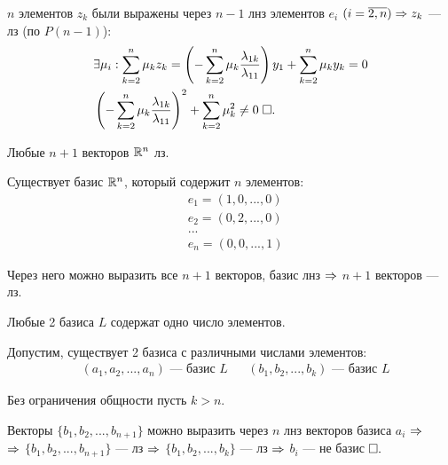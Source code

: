 \documentclass{article}
\begin{document}
\begin{enumerate}
\begin{enumerate}
		$n$ элементов $z_{k}$ были выражены через $n-1$ лнз элементов $e_{i}$ $(i=\overline{2,n})\Rarr z_{k}$ --- лз (по $P(n-1)$):
		\begin{align*}
			 & \exists\mu_{i}:\sum_{k=2}^{n}\mu_{k}z_{k}=\left(-\sum_{k=2}^{n}\mu_{k}\frac{\lambda_{1k}}{\lambda_{11}}\right)y_1+\sum_{k=2}^{n}\mu_{k}y_{k}=0 \\
			 & \left(-\sum_{k=2}^{n}\mu_{k}\frac{\lambda_{1k}}{\lambda_{11}}\right)^{2}+\sum_{k=2}^{n}\mu_{k}^{2}\neq 0\qed
		\end{align*}
	\end{enumerate}
\end{enumerate}

\pagebreak

\result[1]

Любые $n+1$ векторов $\R^{n}$ лз.

\proof

Существует базис $\R^{n}$, который содержит $n$ элементов:
\begin{align*}
	 & e_1=(1,0,...,0)   \\
	 & e_2=(0,2,...,0)   \\
	 & ...               \\
	 & e_{n}=(0,0,...,1)
\end{align*}

Через него можно выразить все $n+1$ векторов, базис лнз $\Rarr$ $n+1$ векторов --- лз.

\result[2]

Любые 2 базиса $L$ содержат одно число элементов.

\proof

Допустим, существует 2 базиса с различными числами элементов:
\begin{align*}
	 & (a_1,a_2,...,a_{n})\text{ --- базис $L$} &  & (b_1,b_2,...,b_{k})\text{ --- базис $L$}
\end{align*}

Без ограничения общности пусть $k>n$.

Векторы $\{b_1,b_2,...,b_{n+1}\}$ можно выразить через $n$ лнз векторов базиса $a_{i}$ $\Rarr$\\
$\Rarr$ $\{b_1,b_2,...,b_{n+1}\}$ --- лз $\Rarr$ $\{b_1,b_2,...,b_{k}\}$ --- лз $\Rarr$ $b_{i}$ --- не базис$\qed$
\end{document}
